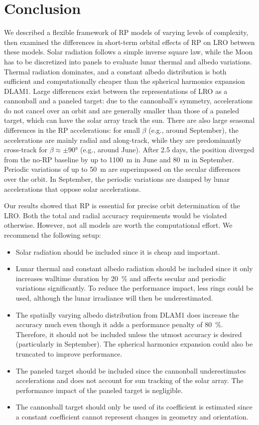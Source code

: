 \section{Conclusion}
We described a flexible framework of \gls{RP} models of varying levels of complexity, then examined the differences in short-term orbital effects of \gls{RP} on \gls{LRO} between these models. Solar radiation follows a simple inverse square law, while the Moon has to be discretized into panels to evaluate lunar thermal and albedo variations. Thermal radiation dominates, and a constant albedo distribution is both sufficient and computationally cheaper than the spherical harmonics expansion \gls{DLAM1}. Large differences exist between the representations of \gls{LRO} as a cannonball and a paneled target: due to the cannonball's symmetry, accelerations do not cancel over an orbit and are generally smaller than those of a paneled target, which can have the solar array track the sun. There are also large seasonal differences in the \gls{RP} accelerations: for small $\beta$ (e.g., around September), the accelerations are mainly radial and along-track, while they are predominantly cross-track for $\beta \approx \pm \ang{90}$ (e.g., around June). After 2.5 days, the position diverged from the no-\gls{RP} baseline by up to \qty{1100}{\m} in June and \qty{80}{\m} in September. Periodic variations of up to \qty{50}{\m} are superimposed on the secular differences over the orbit. In September, the periodic variations are damped by lunar accelerations that oppose solar accelerations.

Our results showed that \gls{RP} is essential for precise orbit determination of the \gls{LRO}. Both the total and radial accuracy requirements would be violated otherwise. However, not all models are worth the computational effort. We recommend the following setup:
\begin{itemize}
    \item Solar radiation should be included since it is cheap and important.
    \item Lunar thermal and constant albedo radiation should be included since it only increases walltime duration by \qty{20}{\percent} and affects secular and periodic variations significantly. To reduce the performance impact, less rings could be used, although the lunar irradiance will then be underestimated.
    \item The spatially varying albedo distribution from \gls{DLAM1} does increase the accuracy much even though it adds a performance penalty of \qty{80}{\percent}. Therefore, it should not be included unless the utmost accuracy is desired (particularly in September). The spherical harmonics expansion could also be truncated to improve performance.
    \item The paneled target should be included since the cannonball underestimates accelerations and does not account for sun tracking of the solar array. The performance impact of the paneled target is negligible.
    \item The cannonball target should only be used of its coefficient is estimated since a constant coefficient cannot represent changes in geometry and orientation.
\end{itemize}

